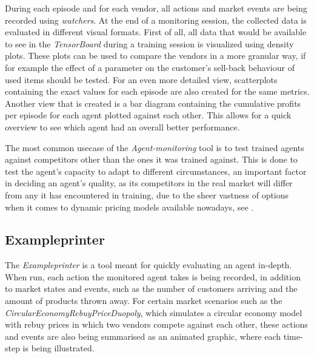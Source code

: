 During each episode and for each vendor, all actions and market events are being recorded using \emph{watchers}. At the end of a monitoring session, the collected data is evaluated in different visual formats. First of all, all data that would be available to see in the \emph{TensorBoard} during a training session is visualized using density plots. These plots can be used to compare the vendors in a more granular way, if for example the effect of a parameter on the customer's sell-back behaviour of used items should be tested. For an even more detailed view, scatterplots containing the exact values for each episode are also created for the same metrics. Another view that is created is a bar diagram containing the cumulative profits per episode for each agent plotted against each other. This allows for a quick overview to see which agent had an overall better performance.

The most common usecase of the \emph{Agent-monitoring} tool is to test trained agents against competitors other than the ones it was trained against. This is done to test the agent's capacity to adapt to different circumstances, an important factor in deciding an agent's quality, as its competitors in the real market will differ from any it has encountered in training, due to the sheer vastness of options when it comes to dynamic pricing models available nowadays, see .

\subsection*{Exampleprinter}

The \emph{Exampleprinter} is a tool meant for quickly evaluating an agent in-depth. When run, each action the monitored agent takes is being recorded, in addition to market states and events, such as the number of customers arriving and the amount of products thrown away. For certain market scenarios such as the \emph{CircularEconomyRebuyPriceDuopoly}, which simulates a circular economy model with rebuy prices in which two vendors compete against each other, these actions and events are also being summarised as an animated graphic, where each time-step is being illustrated. 

